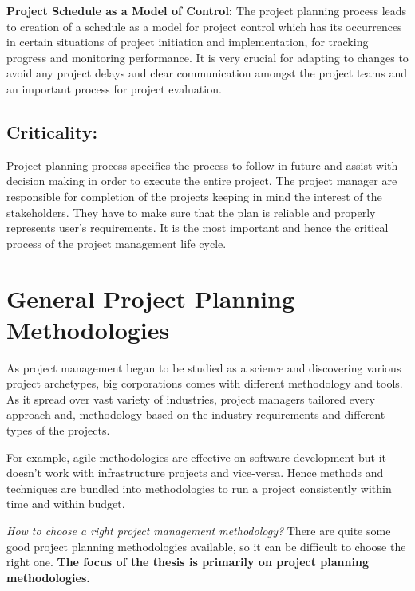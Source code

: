  \textbf{Project Schedule as a Model of Control:} The project planning \cite{Zwikael} process leads to creation of a schedule as a model for project control which has its occurrences in certain situations of project initiation and implementation, for tracking progress and monitoring performance. It is very crucial for adapting to changes to avoid any project delays and clear communication amongst the project teams and an important process for project evaluation.
 

 \subsection{Criticality: }
 
 Project planning \cite{resourceconstraint} process specifies the process to follow in future and assist with decision making in order to execute the entire project. The project manager are responsible for completion of the projects keeping in mind the interest of the stakeholders. They have to make sure that the plan is reliable and properly represents user's requirements. It is the most important and hence the critical process of the project management life cycle.
 

\section{General Project Planning Methodologies}
 \label{sec:sec003}
 
 As project management began to be studied as a science and discovering various project archetypes, big corporations comes with different methodology and tools. As it spread over vast variety of industries, project managers tailored every approach and, methodology based on the industry requirements and different types of the projects.

For example, agile methodologies are effective on software development but it doesn’t work with infrastructure projects and vice-versa. Hence methods and techniques are bundled into methodologies to run a project consistently within time and within budget.

\emph{How to choose a right project management methodology?}
There are quite some good project planning methodologies available, so it can be difficult to choose the right one. \textbf{The focus of the thesis is primarily on project planning methodologies.}

